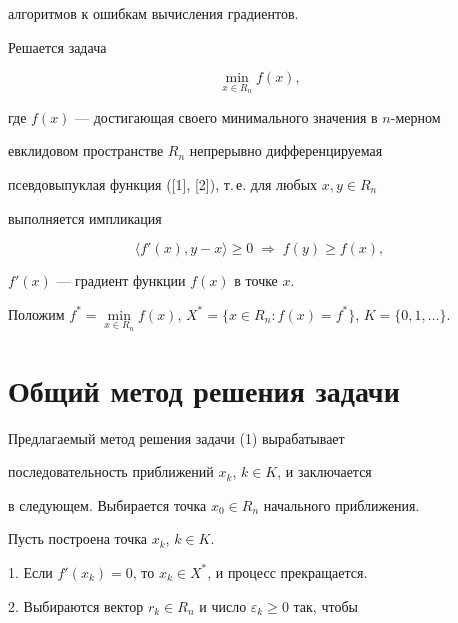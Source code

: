 алгоритмов к ошибкам вычисления градиентов. 





Решается задача


\begin{equation}


\min_{x\in R_n}f(x),


\end{equation}


где $f(x)$ --- достигающая своего минимального значения в $n$-мерном 


евклидовом пространстве $R_n$ непрерывно дифференцируемая


псевдовыпуклая функция ([1], [2]), т.\,е.{} для любых $x,y\in R_n$


выполняется импликация


$$


\langle f'(x),y-x \rangle \geq 0\; \Rightarrow \; f(y)\geq f(x),


$$


$f'(x)$ --- градиент функции $f(x)$ в точке $x$.





Положим $f^*=\min\limits_{x\in R_n}f(x)$, $X^*=\{x\in R_n:


f(x)=f^*\}$, $K=\{0,1,\dotsc\}$.





\section{Общий метод решения задачи}


 


Предлагаемый метод решения задачи (1) вырабатывает 


последовательность приближений $x_k$, $k\in K$, и заключается


в следующем. Выбирается точка $x_0\in R_n$ начального приближения.


Пусть построена точка $x_k$, $k\in K$.





1. Если $f'(x_k)=0$, то $x_k\in X^*$, и процесс прекращается.





2. Выбираются вектор $r_k\in R_n$ и число $\varepsilon_k\geq 0$ так, чтобы


